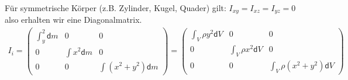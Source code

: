 \documentclass[a4paper, 12pt]{scrartcl}
\begin{document}
Für symmetrische Körper (z.B. Zylinder, Kugel, Quader) 
gilt: $I_{xy} = I_{xz} = I_{yz} = 0$ also erhalten wir eine Diagonalmatrix. 
\begin{align*}
    I_i 
    =
    \begin{pmatrix}
        \int_ y^2 \mathsf{d}m & 0 & 0 \\
        0 & \int x^2 \mathsf{d}m & 0 \\
        0 & 0 & \int (x^2 + y^2) \mathsf{d}m
    \end{pmatrix}
    =
    \begin{pmatrix}
        \int_V \rho y^2 \mathsf{d}V & 0 & 0 \\
        0 & \int_V \rho x^2 \mathsf{d}V & 0 \\
        0 & 0 & \int_V \rho (x^2 + y^2) \mathsf{d}V
    \end{pmatrix}
\end{align*}
\end{document}
